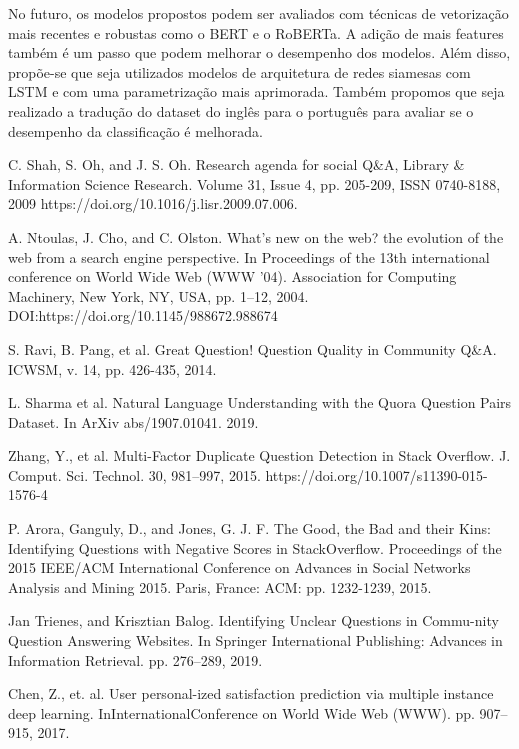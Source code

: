 \documentclass[conference]{IEEEtran}
\begin{document}
No futuro, os modelos propostos podem ser avaliados com técnicas de vetorização mais recentes e robustas como o BERT e o RoBERTa. A adição de mais features também é um passo que podem melhorar o desempenho dos modelos. Além disso, propõe-se que seja utilizados modelos de arquitetura de redes siamesas com LSTM e com uma parametrização mais aprimorada. Também propomos que seja realizado a tradução do dataset do inglês para o português para avaliar se o desempenho da classificação é melhorada.

\begin{thebibliography}{00}

 C. Shah, S. Oh, and J. S. Oh. Research agenda for social Q\&A, Library \& Information Science Research. Volume 31, Issue 4, pp. 205-209, ISSN 0740-8188, 2009 https://doi.org/10.1016/j.lisr.2009.07.006.

 A. Ntoulas, J. Cho, and C. Olston. What's new on the web? the evolution of the web from a search engine perspective. In Proceedings of the 13th international conference on World Wide Web (WWW '04). Association for Computing Machinery, New York, NY, USA, pp. 1–12, 2004. DOI:https://doi.org/10.1145/988672.988674

 S. Ravi, B. Pang, et al. Great Question! Question Quality in Community Q\&A. ICWSM, v. 14, pp. 426-435, 2014.

 L. Sharma et al. Natural Language Understanding with the Quora Question Pairs Dataset. In ArXiv abs/1907.01041. 2019.

 Zhang, Y., et al. Multi-Factor Duplicate Question Detection in Stack Overflow. J. Comput. Sci. Technol. 30, 981–997, 2015. https://doi.org/10.1007/s11390-015-1576-4

 P. Arora, Ganguly, D., and Jones, G. J. F. The Good, the Bad and their Kins: Identifying Questions with Negative Scores in StackOverflow. Proceedings of the 2015 IEEE/ACM International Conference on Advances in Social Networks Analysis and Mining 2015. Paris, France: ACM: pp. 1232-1239, 2015.

 Jan Trienes, and Krisztian Balog. Identifying Unclear Questions in Commu-nity Question Answering Websites. In Springer International Publishing: Advances in Information Retrieval. pp. 276–289, 2019.

 Chen, Z., et. al. User personal-ized satisfaction prediction via multiple instance deep learning. InInternationalConference on World Wide Web (WWW). pp. 907–915, 2017.


\end{thebibliography}
\end{document}
